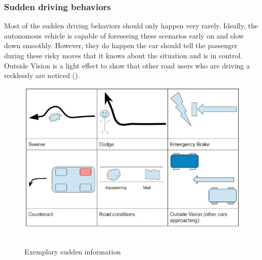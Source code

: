 \subsubsection{Sudden driving behaviors}
Most of the sudden driving behaviors should only happen very rarely. Ideally, the autonomous vehicle is capable of foreseeing these scenarios early on and slow down smoothly. However, they do happen the car should tell the passenger during these risky moves that it knows about the situation and is in control. Outside Vision is a light effect to show that other road users who are driving a recklessly are noticed (). 
\begin{figure}
    \includegraphics[width=1\textwidth]{fig/sudden.JPG}\hfill\
    \caption[Sudden Information]{Exemplary sudden information}
    \label{fig:sudden}
\end{figure}

